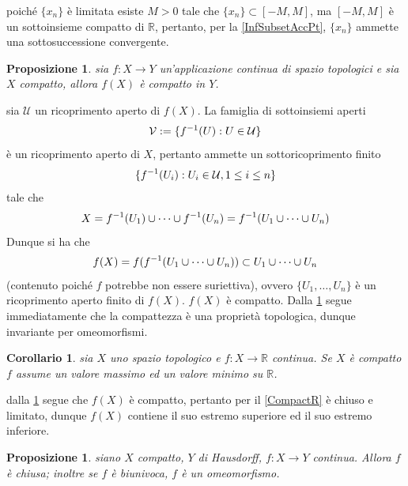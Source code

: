 \documentclass[oneside, 11pt]{amsbook}
\makeatletter
\newcommand{\0}{{(0)}}
\newcommand{\3}{{(3)}}
\theoremstyle{colonplain}
\newtheorem{prop}[thm]{Proposizione}
\newtheorem{cor}[thm]{Corollario}
\theoremstyle{colondefinition}
\theoremstyle{colonremark}
\numberwithin{equation}{chapter}
\renewcommand{\proofname}{Dimostrazione}
\renewenvironment{proof}[1][\proofname]{\par
  \pushQED{\qed}%
  \normalfont \topsep6\p@\@plus6\p@\relax
  \trivlist
  \item[\hskip\labelsep\bfseries #1:]\ignorespaces
}{%
  \popQED\endtrivlist\@endpefalse
}
\makeatother
\begin{document}
\begin{proof}
poiché $\{ x_n \}$ è limitata esiste $M > 0$ tale che $\{ x_n \} \subset [-M, M]$, ma $[-M, M]$ è un sottoinsieme compatto di $\mathbb{R}$, pertanto, per la \cref{InfSubsetAccPt}, $\{ x_n \}$ ammette una sottosuccessione convergente.
\end{proof}
\begin{prop}\label{ContImageCompact}
sia $f : X \longrightarrow Y$ un'applicazione continua di spazio topologici e sia $X$ compatto, allora $f(X)$ è compatto in $Y$.
\end{prop}
\begin{proof}
sia $\mathcal{U}$ un ricoprimento aperto di $f(X)$. La famiglia di sottoinsiemi aperti
\begin{align}
    \mathcal{V} := \{ f^{-1}(U) : U \in \mathcal{U} \} \notag
\end{align}
è un ricoprimento aperto di $X$, pertanto ammette un sottoricoprimento finito
\begin{align}
    \{ f^{-1}(U_i) : U_i \in \mathcal{U}, 1 \leq i \leq n \} \notag
\end{align}
tale che
\begin{align}
    X = f^{-1}(U_1) \cup \dots \cup f^{-1}(U_n) = f^{-1}(U_1 \cup \dots \cup U_n) \notag
\end{align}
Dunque si ha che
\begin{align}
    f(X) = f(f^{-1}(U_1 \cup \dots \cup U_n)) \subset U_1 \cup \dots \cup U_n \notag
\end{align}
(contenuto poiché $f$ potrebbe non essere suriettiva), ovvero $\{ U_1, \dots, U_n\}$ è un ricoprimento aperto finito di $f(X)$. $f(X)$ è compatto.
\end{proof}
Dalla \cref{ContImageCompact} segue immediatamente che la compattezza è una proprietà topologica, dunque invariante per omeomorfismi.
\begin{cor}
sia $X$ uno spazio topologico e $f : X \longrightarrow \mathbb{R}$ continua. Se $X$ è compatto $f$ assume un valore massimo ed un valore minimo su $\mathbb{R}$.
\end{cor}
\begin{proof}
dalla \cref{ContImageCompact} segue che $f(X)$ è compatto, pertanto per il \cref{CompactR} è chiuso e limitato, dunque $f(X)$ contiene il suo estremo superiore ed il suo estremo inferiore.
\end{proof}
\begin{prop}
siano $X$ compatto, $Y$ di Hausdorff, $f : X \longrightarrow Y$ continua. Allora $f$ è chiusa; inoltre se $f$ è biunivoca, $f$ è un omeomorfismo.
\end{prop}
\end{document}
